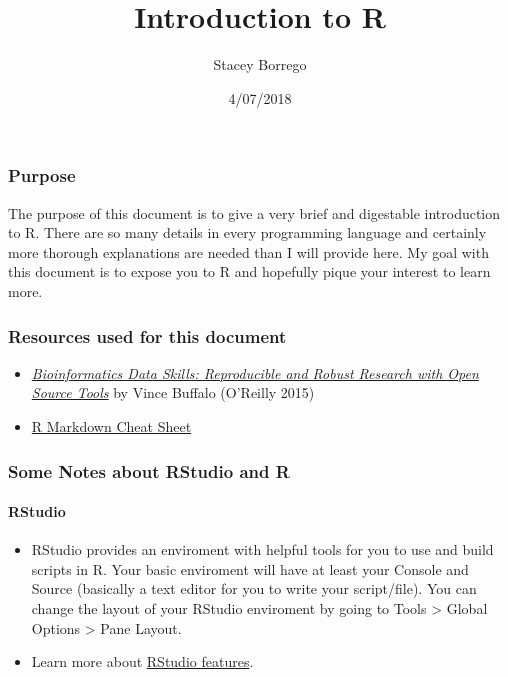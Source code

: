 \documentclass[]{article}
\title{Introduction to R}
\author{Stacey Borrego}
\date{4/07/2018}
\providecommand{\tightlist}{%
  \setlength{\itemsep}{0pt}\setlength{\parskip}{0pt}}
\let\oldparagraph\paragraph
\renewcommand{\paragraph}[1]{\oldparagraph{#1}\mbox{}}
\begin{document}
\maketitle

\subsubsection{Purpose}\label{purpose}

The purpose of this document is to give a very brief and digestable
introduction to R. There are so many details in every programming
language and certainly more thorough explanations are needed than I will
provide here. My goal with this document is to expose you to R and
hopefully pique your interest to learn more.

\subsubsection{Resources used for this
document}\label{resources-used-for-this-document}

\begin{itemize}
\tightlist
\item
  \href{http://shop.oreilly.com/product/0636920030157.do}{\emph{Bioinformatics
  Data Skills: Reproducible and Robust Research with Open Source Tools}}
  by Vince Buffalo (O'Reilly 2015)
\item
  \href{https://www.rstudio.com/wp-content/uploads/2015/02/rmarkdown-cheatsheet.pdf}{R
  Markdown Cheat Sheet}
\end{itemize}

\subsubsection{Some Notes about RStudio and
R}\label{some-notes-about-rstudio-and-r}

\paragraph{RStudio}\label{rstudio}

\begin{itemize}
\tightlist
\item
  RStudio provides an enviroment with helpful tools for you to use and
  build scripts in R. Your basic enviroment will have at least your
  Console and Source (basically a text editor for you to write your
  script/file). You can change the layout of your RStudio enviroment by
  going to Tools \textgreater{} Global Options \textgreater{} Pane
  Layout.
\item
  Learn more about
  \href{https://www.rstudio.com/products/rstudio/features/}{RStudio
  features}.
\end{itemize}
\end{document}
